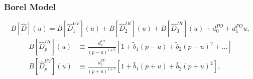 \documentclass[fleqn]{beamer}
\begin{document}
\begin{frame}
  \frametitle{Borel Model}
  \begin{equation}
    \label{eq:borelModel}
    B[\widehat D](u) = B[\widehat D_1^{UV}](u) + B[\widehat D_2^{IR}](u) + B[\widehat D_3^{IR}](u) + d_0^{PO} + d_1^{PO}u,
  \end{equation}
  \begin{align}
    B[\widehat D_p^{IR}](u)
    &\equiv \frac{d_p^{IR}}{(p-u)^{1+\tilde \gamma}}
      \left[  1 + \tilde b_1(p-u) + \tilde b_2(p-u)^2 + \dots \right] \\
    B[\widehat D_p^{UV}](u) &\equiv \frac{d_p^{UV}}{(p+u)^{1+\bar\gamma}}\left[1 + \bar b_1(p+u) + \bar b_2(p+u)^2 \right],
  \end{align}
  \cite{Beneke2008}
\end{frame}
\end{document}

